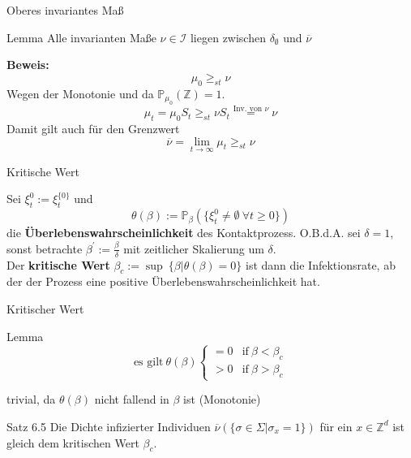 \documentclass[11pt]{beamer}
\begin{document}
\begin{frame}{Oberes invariantes Maß}
    \begin{block}{Lemma}
        Alle invarianten Maße $\nu \in \mathcal{I}$ liegen zwischen $\delta_\emptyset$
        und $\overline{\nu}$
    \end{block}
    \textbf{Beweis:}
    \\
    \begin{equation*}
        \mu_0 \geq_{st} \nu 
    \end{equation*}
    Wegen der Monotonie und da $\mathbb{P}_{\mu_0}(\mathbb{Z}) = 1$.
    \begin{equation*}
        \mu_t = \mu_0 S_t \geq_{st} \nu S_t \overset{\text{Inv. von }\nu}{=} \nu
    \end{equation*}
    Damit gilt auch für den Grenzwert
    \begin{equation*}
        \overline{\nu} = \lim_{t \to \infty} \mu_t \geq_{st} \nu
    \end{equation*}
\end{frame}

\begin{frame}{Kritische Wert}
    
    Sei $\xi_t^0 := \xi_t^{\{0\}}$ und
    \begin{equation*}
        \theta(\beta) := \mathbb{P}_\beta(\{ \xi_t^0 \not= \emptyset\ \forall t \geq 0 \})
    \end{equation*}
    die \textbf{Überlebenswahrscheinlichkeit} des Kontaktprozess. O.B.d.A. sei $\delta = 1$,
    sonst betrachte $\beta^\prime := \frac{\beta}{\delta} $
    mit zeitlicher Skalierung um $\delta$.
    \\
    \vspace{0.5cm}
    Der \textbf{kritische Wert} $\beta_c := \sup\ \{ \beta | \theta(\beta) = 0 \}$ ist dann
    die Infektionsrate, ab der der Prozess eine positive Überlebenswahrscheinlichkeit hat.
\end{frame}

\begin{frame}{Kritischer Wert}
    \begin{block}{Lemma}
        \begin{equation*}
            \text{es gilt}\ \theta(\beta) 
            \begin{cases}
                = 0 & \text{if}\ \beta < \beta_c\\
                > 0 & \text{if}\ \beta > \beta_c
            \end{cases}
        \end{equation*}
    \end{block}
    trivial, da $\theta(\beta)$ nicht fallend in $\beta$ ist (Monotonie)
    \begin{block}{Satz 6.5}
        Die Dichte infizierter Individuen
        $\overline{\nu}(\{ \sigma \in \Sigma | \sigma_x = 1 \})$ für ein $x \in \mathbb{Z}^d$
        ist gleich dem kritischen Wert $\beta_c$.
    \end{block}
\end{frame}
\end{document}
